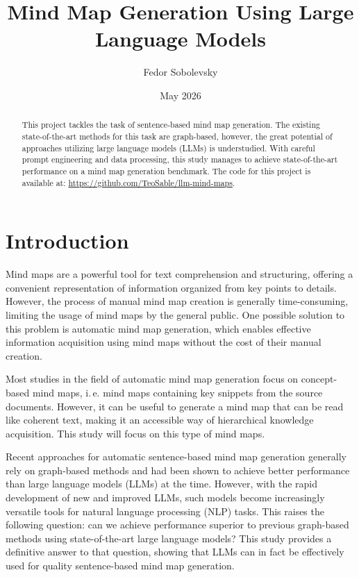 \documentclass{article}
\title{Mind Map Generation Using Large Language Models}
\author{Fedor Sobolevsky}
\date{May 2026}
\begin{document}
\maketitle
\begin{abstract}
    This project tackles the task of sentence-based mind map generation. The existing state-of-the-art methods for this task are graph-based, however, the great potential of approaches utilizing large language models (LLMs) is understudied. With careful prompt engineering and data processing, this study manages to achieve state-of-the-art performance on a mind map generation benchmark. The code for this project is available at: \url{https://github.com/TeoSable/llm-mind-maps}.
\end{abstract}



\section{Introduction}
Mind maps are a powerful tool for text comprehension and structuring, offering a convenient representation of information organized from key points to details. However, the process of manual mind map creation is generally time-consuming, limiting the usage of mind maps by the general public. One possible solution to this problem is automatic mind map generation, which enables effective information acquisition using mind maps without the cost of their manual creation.

Most studies in the field of automatic mind map generation focus on concept-based mind maps, i.\,e. mind maps containing key snippets from the source documents. However, it can be useful to generate a mind map that can be read like coherent text, making it an accessible way of hierarchical knowledge acquisition. This study will focus on this type of mind maps.

Recent approaches for automatic sentence-based mind map generation generally rely on graph-based methods and had been shown to achieve better performance than large language models (LLMs) at the time. However, with the rapid development of new and improved LLMs, such models become increasingly versatile tools for natural language processing (NLP) tasks. This raises the following question: can we achieve performance superior to previous graph-based methods using state-of-the-art large language models? This study provides a definitive answer to that question, showing that LLMs can in fact be effectively used for quality sentence-based mind map generation.
\end{document}
